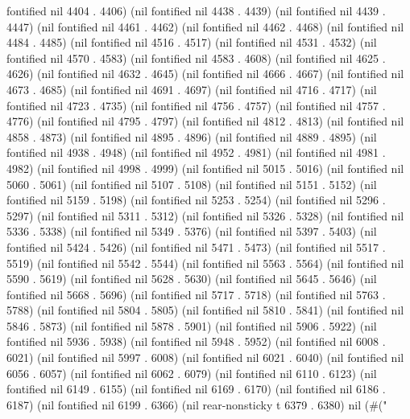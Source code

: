 fontified nil 4404 . 4406) (nil fontified nil 4438 . 4439) (nil fontified nil 4439 . 4447) (nil fontified nil 4461 . 4462) (nil fontified nil 4462 . 4468) (nil fontified nil 4484 . 4485) (nil fontified nil 4516 . 4517) (nil fontified nil 4531 . 4532) (nil fontified nil 4570 . 4583) (nil fontified nil 4583 . 4608) (nil fontified nil 4625 . 4626) (nil fontified nil 4632 . 4645) (nil fontified nil 4666 . 4667) (nil fontified nil 4673 . 4685) (nil fontified nil 4691 . 4697) (nil fontified nil 4716 . 4717) (nil fontified nil 4723 . 4735) (nil fontified nil 4756 . 4757) (nil fontified nil 4757 . 4776) (nil fontified nil 4795 . 4797) (nil fontified nil 4812 . 4813) (nil fontified nil 4858 . 4873) (nil fontified nil 4895 . 4896) (nil fontified nil 4889 . 4895) (nil fontified nil 4938 . 4948) (nil fontified nil 4952 . 4981) (nil fontified nil 4981 . 4982) (nil fontified nil 4998 . 4999) (nil fontified nil 5015 . 5016) (nil fontified nil 5060 . 5061) (nil fontified nil 5107 . 5108) (nil fontified nil 5151 . 5152) (nil fontified nil 5159 . 5198) (nil fontified nil 5253 . 5254) (nil fontified nil 5296 . 5297) (nil fontified nil 5311 . 5312) (nil fontified nil 5326 . 5328) (nil fontified nil 5336 . 5338) (nil fontified nil 5349 . 5376) (nil fontified nil 5397 . 5403) (nil fontified nil 5424 . 5426) (nil fontified nil 5471 . 5473) (nil fontified nil 5517 . 5519) (nil fontified nil 5542 . 5544) (nil fontified nil 5563 . 5564) (nil fontified nil 5590 . 5619) (nil fontified nil 5628 . 5630) (nil fontified nil 5645 . 5646) (nil fontified nil 5668 . 5696) (nil fontified nil 5717 . 5718) (nil fontified nil 5763 . 5788) (nil fontified nil 5804 . 5805) (nil fontified nil 5810 . 5841) (nil fontified nil 5846 . 5873) (nil fontified nil 5878 . 5901) (nil fontified nil 5906 . 5922) (nil fontified nil 5936 . 5938) (nil fontified nil 5948 . 5952) (nil fontified nil 6008 . 6021) (nil fontified nil 5997 . 6008) (nil fontified nil 6021 . 6040) (nil fontified nil 6056 . 6057) (nil fontified nil 6062 . 6079) (nil fontified nil 6110 . 6123) (nil fontified nil 6149 . 6155) (nil fontified nil 6169 . 6170) (nil fontified nil 6186 . 6187) (nil fontified nil 6199 . 6366) (nil rear-nonsticky t 6379 . 6380) nil (#("
